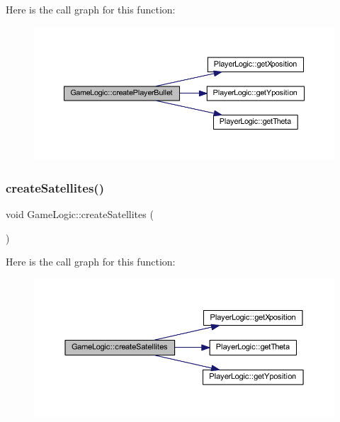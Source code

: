 Here is the call graph for this function\+:\nopagebreak
\begin{figure}[H]
\begin{center}
\leavevmode
\includegraphics[width=350pt]{class_game_logic_a05dec53eb3c36cf1a669c973fa0b16ae_cgraph}
\end{center}
\end{figure}
\mbox{\label{class_game_logic_ab2b56581a56239bb837e6eeea0a2991d}} 
\subsubsection{\texorpdfstring{create\+Satellites()}{createSatellites()}}
{\footnotesize\ttfamily void Game\+Logic\+::create\+Satellites (\begin{DoxyParamCaption}{ }\end{DoxyParamCaption})}

Here is the call graph for this function\+:\nopagebreak
\begin{figure}[H]
\begin{center}
\leavevmode
\includegraphics[width=350pt]{class_game_logic_ab2b56581a56239bb837e6eeea0a2991d_cgraph}
\end{center}
\end{figure}
\mbox{\label{class_game_logic_a34fd5f74aec0365dff0631384740a45b}} 
